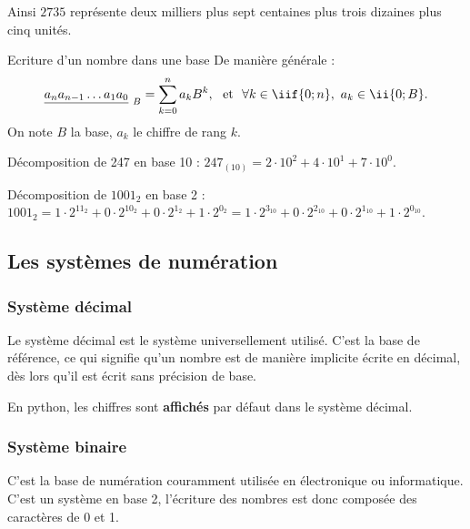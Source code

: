 Ainsi $2735$ représente deux milliers plus sept centaines plus trois dizaines plus cinq unités.

\begin{defi}{Ecriture d'un nombre dans une base }
De manière générale :%
$$\displaystyle\underline{a_{n}a_{n-1}\ldots a_{1}a_{0}}_{~B} =
\sum_{k=0}^{n}a_{k}B^{k},~ \textrm{ et }~\forall k \in \iif{0;n},~ a_k\in\ii{0;B}.$$ 
On note $B$ la base, $a_k$ le chiffre de rang $k$.
\end{defi}

\begin{exemple}
Décomposition de 247 en base 10 : $247_{(10)} = 2\cdot 10^2 + 4\cdot 10^1 + 7\cdot 10^0$.

Décomposition de $1001_2$ en base 2 : $1001_2 = 1\cdot 2^{11_2} + 0\cdot 2^{10_2} + 0\cdot 2^{1_2} + 1\cdot 2^{0_2} 
= 1\cdot 2^{3_{10}} + 0\cdot 2^{2_{10}} + 0\cdot 2^{1_{10}} + 1\cdot 2^{0_{10}}$.
\end{exemple}



\subsection{Les systèmes de numération}
\subsubsection{Système décimal}
Le système décimal est le système universellement utilisé. C'est la base de référence, ce qui signifie qu'un nombre est de manière implicite écrite en décimal, dès lors qu'il est écrit sans précision de base. 

En python, les chiffres sont \textbf{affichés} par défaut dans le système décimal. 

\subsubsection{Système binaire}

C'est la base de numération couramment utilisée en électronique ou informatique. C'est un système en base 2, l'écriture des nombres est donc composée des caractères de 0 et 1. 

